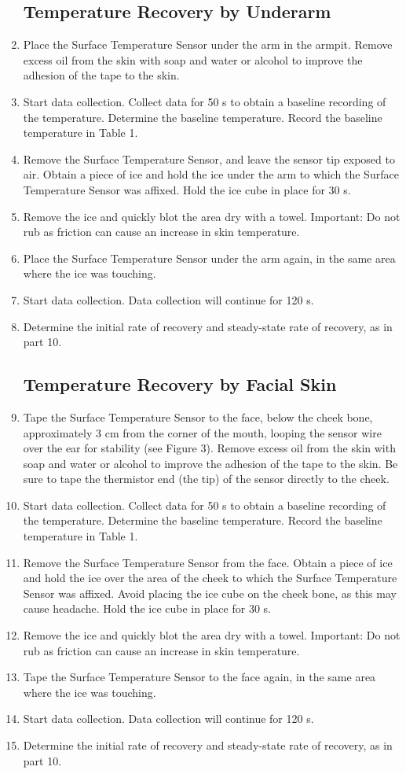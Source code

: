 \documentclass[12pt,oneside]{article}
\begin{document}
\begin{enumerate}
\subsection{Temperature Recovery by Underarm}
\item		Place the Surface Temperature Sensor under the arm in the armpit. Remove excess oil from the skin with soap and water or alcohol to improve the adhesion of the tape to the skin. 
\item		Start data collection. Collect data for 50 s to obtain a baseline recording of the temperature. Determine the baseline temperature. Record the baseline temperature in Table 1.
\item		Remove the Surface Temperature Sensor, and leave the sensor tip exposed to air. Obtain a piece of ice and hold the ice under the arm to which the Surface Temperature Sensor was affixed. Hold the ice cube in place for 30 s.
\item		Remove the ice and quickly blot the area dry with a towel. Important: Do not rub as friction can cause an increase in skin temperature.
\item		Place the Surface Temperature Sensor under the arm again, in the same area where the ice was touching.
\item		Start data collection. Data collection will continue for 120 s.
\item		Determine the initial rate of recovery and steady-state rate of recovery, as in part 10.

\subsection{Temperature Recovery by Facial Skin}
\item	Tape the Surface Temperature Sensor to the face, below the cheek bone, approximately 3 cm from the corner of the mouth, looping the sensor wire over the ear for stability (see Figure 3). Remove excess oil from the skin with soap and water or alcohol to improve the adhesion of the tape to the skin. Be sure to tape the thermistor end (the tip) of the sensor directly to the cheek. 
\item	Start data collection. Collect data for 50 s to obtain a baseline recording of the temperature. Determine the baseline temperature. Record the baseline temperature in Table 1.
\item	Remove the Surface Temperature Sensor from the face. Obtain a piece of ice and hold the ice over the area of the cheek to which the Surface Temperature Sensor was affixed. Avoid placing the ice cube on the cheek bone, as this may cause headache. Hold the ice cube in place for 30 s.
\item	Remove the ice and quickly blot the area dry with a towel. Important: Do not rub as friction can cause an increase in skin temperature.
\item	Tape the Surface Temperature Sensor to the face again, in the same area where the ice was touching.
\item	Start data collection. Data collection will continue for 120 s.
\item	Determine the initial rate of recovery and steady-state rate of recovery, as in part 10.


\end{enumerate}
\end{document}
